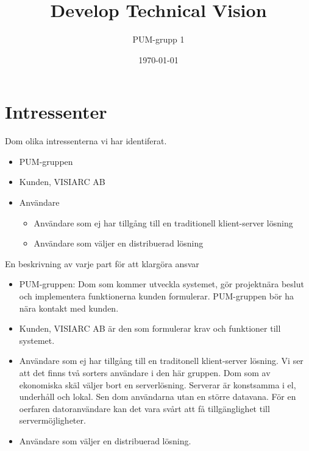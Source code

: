 

\ifpdf
\else
\fi

\title{Develop Technical Vision}
\author{PUM-grupp 1}
\date{\today}



\maketitle\thispagestyle{empty}
\newpage
\section{Intressenter}
Dom olika intressenterna vi har identiferat.
\begin{itemize}
\item PUM-gruppen
\item Kunden, VISIARC AB
\item Användare
\begin{itemize}
\item Användare som ej har tillgång till en traditionell klient-server lösning
\item Användare som väljer en distribuerad lösning
\end{itemize}
\end{itemize}
En beskrivning av varje part för att klargöra ansvar  
\begin{itemize}
\item PUM-gruppen: Dom som kommer utveckla systemet, gör projektnära beslut och implementera funktionerna kunden formulerar.  PUM-gruppen bör ha nära kontakt med kunden.
\item Kunden, VISIARC AB är den som formulerar krav och funktioner till systemet. 
\item Användare som ej har tillgång till en traditonell klient-server lösning. Vi ser att det finns två sorters användare i den här gruppen. Dom som av ekonomiska skäl väljer bort en serverlösning. Serverar är konstsamma i el, underhåll och lokal. Sen dom användarna utan en större datavana. För en oerfaren datoranvändare kan det vara svårt att få tillgänglighet till servermöjligheter. 
\item Användare som väljer en distribuerad lösning.
\end{itemize}

